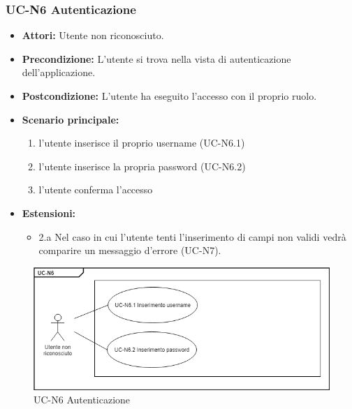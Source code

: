 \subsubsection{UC-N6 Autenticazione}
		\begin{itemize}
			\item \textbf{Attori:} Utente non riconosciuto.
			\item \textbf{Precondizione:} L'utente si trova nella vista di autenticazione dell'applicazione.
			\item \textbf{Postcondizione:} L'utente ha eseguito l'accesso con il proprio ruolo.
			\item \textbf{Scenario principale:}
				\begin{enumerate}
					\item l'utente inserisce il proprio username (UC-N6.1)
					\item l'utente inserisce la propria password (UC-N6.2)
					\item l'utente conferma l'accesso
				\end{enumerate}
				\item \textbf{Estensioni:}
				\begin{itemize}
					\item 2.a Nel caso in cui l'utente tenti l'inserimento di campi non validi vedrà comparire un messaggio d'errore (UC-N7).
				\end{itemize}
		\end{itemize}
	\begin{figure}[htbp]
			\centering
			\includegraphics[scale=0.7]{images/UC-N6.png}
			\caption{UC-N6 Autenticazione}
		\end{figure}		
		
		

